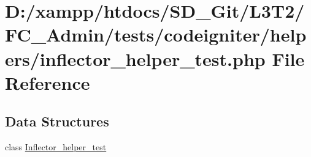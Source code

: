 \hypertarget{inflector__helper__test_8php}{}\section{D\+:/xampp/htdocs/\+S\+D\+\_\+\+Git/\+L3\+T2/\+F\+C\+\_\+\+Admin/tests/codeigniter/helpers/inflector\+\_\+helper\+\_\+test.php File Reference}
\label{inflector__helper__test_8php}
\subsection*{Data Structures}
\begin{DoxyCompactItemize}
\item 
class \hyperlink{class_inflector__helper__test}{Inflector\+\_\+helper\+\_\+test}
\end{DoxyCompactItemize}
